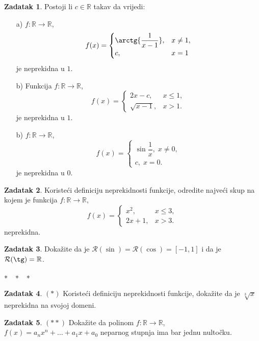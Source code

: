 \documentclass{book}
\theoremstyle{definition}
\theoremstyle{definition}
\newtheorem{exercise}{Zadatak}
\theoremstyle{remark}
\begin{document}
\begin{exercise}
Postoji li $c\in \mathbb{R}$ takav da vrijedi:
\begin{itemize}
\item[a)] $f : \mathbb{R}\to \mathbb{R}$, $$f(x)=\begin{cases}
\arctg{\dfrac{1}{x-1}},& x\neq 1,\\
c, & x=1
\end{cases}$$ 
je neprekidna u $1$.
\item[b)] Funkcija $f : \mathbb{R}\to \mathbb{R}$, $$f(x)=\begin{cases}
2x-c,& x\leq 1,\\
\sqrt{x-1},& x>1.
\end{cases}$$
je neprekidna u $1$.
\item[b)] $f : \mathbb{R}\to \mathbb{R}$, $$f(x)=\begin{cases}
\sin{\dfrac{1}{x}},\; x\neq 0,\\
c,\; x=0.
\end{cases}$$
je neprekidna u $0$.
\end{itemize}
\end{exercise}
\begin{exercise}
Koristeći definiciju neprekidnosti funkcije, odredite najveći skup na kojem je funkcija $f : \mathbb{R}\to \mathbb{R}$,
$$f(x)=\begin{cases}
x^2,& x\leq 3,\\
2x+1,& x>3.
\end{cases}$$
neprekidna.
\end{exercise}
\begin{exercise}
Dokažite da je $\mathcal{R}(\sin)=\mathcal{R}(\cos)=[-1, 1]$ i da je $\mathcal{R}(\tg)=\mathbb{R}$.
\end{exercise}
\begin{center}
$*\hspace{0.3cm}*\hspace{0.3cm}*\hspace{0.3cm}$
\end{center}
\begin{exercise} $(*)$
Koristeći definiciju neprekidnosti funkcije, dokažite da je $\sqrt[3]{x}$ neprekidna na svojoj domeni.
\end{exercise}
\begin{exercise} $(**)$
Dokažite da polinom $f : \mathbb{R}\to \mathbb{R}$, $f(x)=a_nx^n+\dots+a_1x+a_0$ neparnog stupnja ima bar jednu nultočku.
\end{exercise}
\end{document}
